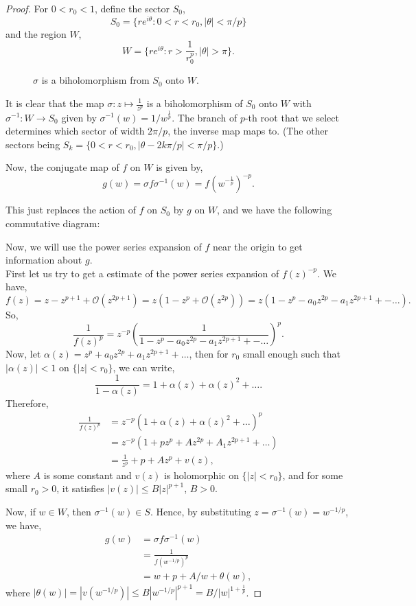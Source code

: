 \begin{proof}
	For \( 0<r_0<1 \), define the sector \( S_0 \), \[
		S_0=\{re^{i\theta}:0<r<r_0,|\theta |<\pi /p \}
	\] and the region \( W \), \[
	W=\{re^{i\theta }:r>\frac{1}{r_0^p},|\theta |>\pi\}
	.\] 

\begin{figure}[ht] \centering
    \caption{$\sigma$ is a biholomorphism from $S_0$ onto $W$.}
    \label{sigmamap}
\end{figure}

	It is clear that the map \( \sigma:z\mapsto \frac{1}{z^p} \) is a biholomorphism
	of \( S_0 \) onto \( W \) with \( \sigma^{-1}:W\to S_0 \) given by \( \sigma^{-1}(w)=1 /w^{\frac{1}{p}} \).
	The branch of \( p \)-th root that we select determines which sector of width \( 2\pi /p \), the inverse map
	maps to. (The other sectors being \( S_k=\{0<r<r_0,|\theta -2k\pi /p|<\pi /p \} \).)

	Now, the conjugate map of \( f \) on \( W \) is given by,\[
		g(w)=\sigma f \sigma ^{-1}(w)=f(w^{-\frac{1}{p}})^{-p}
	.\]

	This just replaces the action of \( f \) on \( S_0 \) by \( g \) on \( W \),
	and we have the following commutative diagram:

	Now, we will use the power series expansion of \( f \) near the origin to
	get information about \( g \).\\
	First let us try to get a estimate of the power series expansion of \( f(z)^{-p} \).
	We have, \[
		f(z)=z-z^{p+1}+\mathcal{O}(z^{2p+1})=z(1-z^p+\mathcal{O}(z^{2p}))=z(1-z^p-a_0z^{2p}-a_1z^{2p+1}+-\ldots)
	.\] 
	So, \[
		\frac{1}{f(z)^p}=z^{-p}\left(\frac{1}{1-z^p-a_0z^{2p}-a_1z^{2p+1}+-\ldots}\right)^p
	.\]  
	Now, let \( \alpha(z)=z^p+a_0z^{2p}+a_1z^{2p+1}+\ldots \), 
	then for \( r_0 \) small enough
	such that \( |\alpha(z)|<1 \) on \( \{|z|<r_0\} \), we can write, \[
		\frac{1}{1-\alpha(z)}=1+\alpha(z)+\alpha(z)^2+\ldots 
	.\] 
	Therefore,
	\begin{align*}
		\frac{1}{f(z)^p}&=z^{-p}(1+\alpha(z)+\alpha(z)^2+\ldots )^p\\
						&=z^{-p}(1+pz^p+Az^{2p}+A_1z^{2p+1}+\ldots )\\
						&=\frac{1}{z^p}+p+Az^p+v(z)
	,\end{align*} where \( A \) is some constant and \( v(z) \) is holomorphic
	on \( \{|z|< r_0\} \), and for some small \( r_0>0 \),
	it satisfies \( |v(z)| \le B|z|^{p+1} \), \( B>0 \).

	Now, if \( w\in W \), then \( \sigma^{-1}(w)\in S \). Hence, by substituting \( z=\sigma^{-1}(w)=w^{-1/p} \), we have,
	\begin{align*}
		g(w)&=\sigma f\sigma^{-1}(w)\\
			&=\frac{1}{f(w^{-1/p})^{p}}\\
			&=w+p+A /w+\theta(w)
		,\end{align*} where \( |\theta (w)|=|v(w^{-1/p})|\le B|w^{-1/p}|^{p+1}=B /|w|^{1+\frac{1}{p}} \).


\end{proof}
